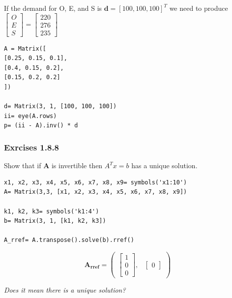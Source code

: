 If the demand for O, E, and S is $\mathbf{d} = [100, 100, 100]^T$ we need to
produce
$\left[\begin{matrix}O \\ E \\ S \end{matrix}\right] = \left[\begin{matrix}220 \\ 276 \\ 235 \end{matrix}\right]$

\begin{verbatim}
A = Matrix([
[0.25, 0.15, 0.1],
[0.4, 0.15, 0.2],
[0.15, 0.2, 0.2]
])

d= Matrix(3, 1, [100, 100, 100])
ii= eye(A.rows)
p= (ii - A).inv() * d
\end{verbatim}



\subsubsection{Exrcises 1.8.8}

Show that if \textbf{A} is invertible then $A^Tx=b$ has a unique solution.

\begin{verbatim}
x1, x2, x3, x4, x5, x6, x7, x8, x9= symbols('x1:10')
A= Matrix(3,3, [x1, x2, x3, x4, x5, x6, x7, x8, x9])

k1, k2, k3= symbols('k1:4')
b= Matrix(3, 1, [k1, k2, k3])

A_rref= A.transpose().solve(b).rref()
\end{verbatim}

\begin{equation}\label{eq:}
\mathbf{A_{rref}} = \begin{pmatrix}\left[\begin{matrix}1\\0\\0\end{matrix}\right], & \begin{bmatrix}0\end{bmatrix}\end{pmatrix}
\end{equation}

\textit{Does it mean there is a unique solution?}